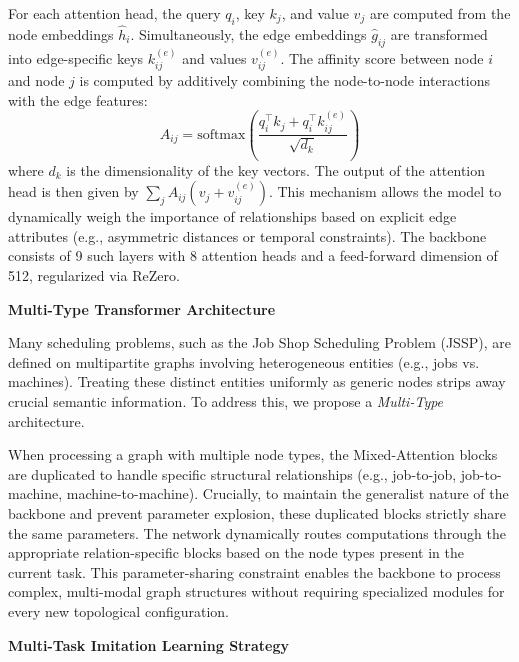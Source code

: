 \vspace{0.5em}
\noindent For each attention head, the query $q_i$, key $k_j$, and value $v_j$ are computed from the node embeddings $\hat{h}_i$. Simultaneously, the edge embeddings $\hat{g}_{ij}$ are transformed into edge-specific keys $k^{(e)}_{ij}$ and values $v^{(e)}_{ij}$. The affinity score between node $i$ and node $j$ is computed by additively combining the node-to-node interactions with the edge features:
\[
    A_{ij} = \text{softmax} \left( \frac{q_i^\top k_j + q_i^\top k^{(e)}_{ij}}{\sqrt{d_k}} \right)
\]
where $d_k$ is the dimensionality of the key vectors. The output of the attention head is then given by $\sum_j A_{ij} (v_j + v^{(e)}_{ij})$. This mechanism allows the model to dynamically weigh the importance of relationships based on explicit edge attributes (e.g., asymmetric distances or temporal constraints). The backbone consists of 9 such layers with 8 attention heads and a feed-forward dimension of 512, regularized via ReZero.

\vspace{1em}
\noindent\textbf{Multi-Type Transformer Architecture}
\vspace{0.5em}

\noindent Many scheduling problems, such as the Job Shop Scheduling Problem (JSSP), are defined on multipartite graphs involving heterogeneous entities (e.g., jobs vs. machines). Treating these distinct entities uniformly as generic nodes strips away crucial semantic information. To address this, we propose a \textit{Multi-Type} architecture. 

\vspace{0.5em}
\noindent When processing a graph with multiple node types, the Mixed-Attention blocks are duplicated to handle specific structural relationships (e.g., job-to-job, job-to-machine, machine-to-machine). Crucially, to maintain the generalist nature of the backbone and prevent parameter explosion, these duplicated blocks strictly share the same parameters. The network dynamically routes computations through the appropriate relation-specific blocks based on the node types present in the current task. This parameter-sharing constraint enables the backbone to process complex, multi-modal graph structures without requiring specialized modules for every new topological configuration.

\vspace{1em}
\noindent\textbf{Multi-Task Imitation Learning Strategy}
\vspace{0.5em}

